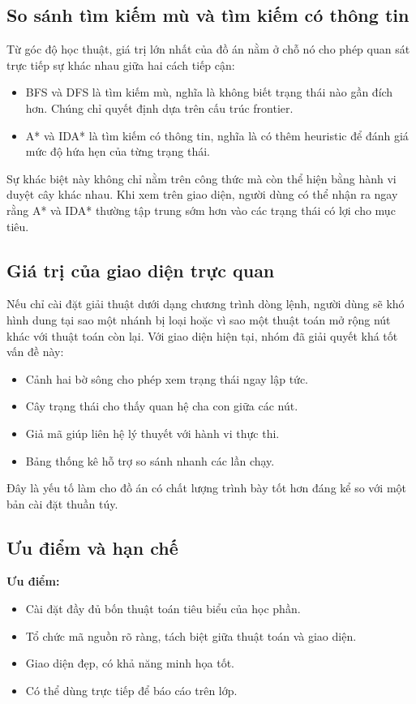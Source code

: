 \documentclass[a4paper,12pt]{article}
\begin{document}
\subsection{So sánh tìm kiếm mù và tìm kiếm có thông tin}

Từ góc độ học thuật, giá trị lớn nhất của đồ án nằm ở chỗ nó cho phép quan sát trực tiếp sự khác nhau giữa hai cách tiếp cận:
\begin{itemize}
    \item BFS và DFS là tìm kiếm mù, nghĩa là không biết trạng thái nào gần đích hơn. Chúng chỉ quyết định dựa trên cấu trúc frontier.
    \item A* và IDA* là tìm kiếm có thông tin, nghĩa là có thêm heuristic để đánh giá mức độ hứa hẹn của từng trạng thái.
\end{itemize}

Sự khác biệt này không chỉ nằm trên công thức mà còn thể hiện bằng hành vi duyệt cây khác nhau. Khi xem trên giao diện, người dùng có thể nhận ra ngay rằng A* và IDA* thường tập trung sớm hơn vào các trạng thái có lợi cho mục tiêu.

\subsection{Giá trị của giao diện trực quan}

Nếu chỉ cài đặt giải thuật dưới dạng chương trình dòng lệnh, người dùng sẽ khó hình dung tại sao một nhánh bị loại hoặc vì sao một thuật toán mở rộng nút khác với thuật toán còn lại. Với giao diện hiện tại, nhóm đã giải quyết khá tốt vấn đề này:
\begin{itemize}
    \item Cảnh hai bờ sông cho phép xem trạng thái ngay lập tức.
    \item Cây trạng thái cho thấy quan hệ cha con giữa các nút.
    \item Giả mã giúp liên hệ lý thuyết với hành vi thực thi.
    \item Bảng thống kê hỗ trợ so sánh nhanh các lần chạy.
\end{itemize}

Đây là yếu tố làm cho đồ án có chất lượng trình bày tốt hơn đáng kể so với một bản cài đặt thuần túy.

\subsection{Ưu điểm và hạn chế}

\textbf{Ưu điểm:}
\begin{itemize}
    \item Cài đặt đầy đủ bốn thuật toán tiêu biểu của học phần.
    \item Tổ chức mã nguồn rõ ràng, tách biệt giữa thuật toán và giao diện.
    \item Giao diện đẹp, có khả năng minh họa tốt.
    \item Có thể dùng trực tiếp để báo cáo trên lớp.
\end{itemize}
\end{document}
